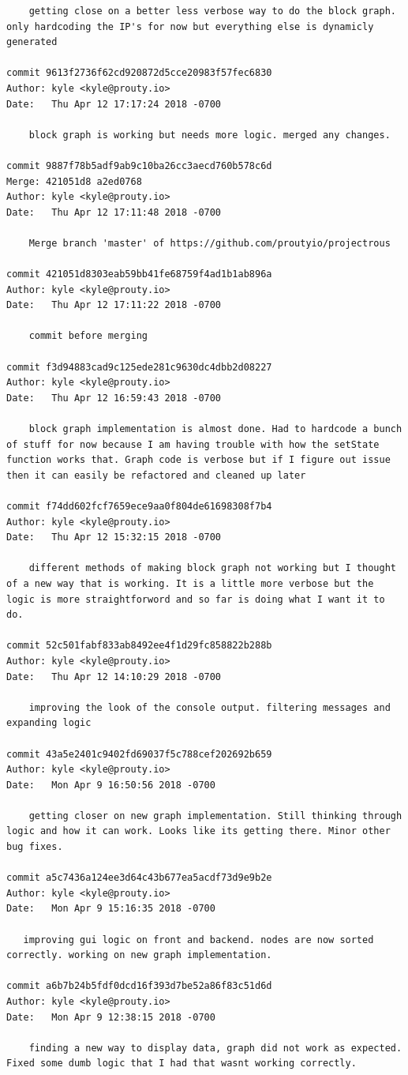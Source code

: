 \documentclass[draftclsnofoot, onecolumn, compsoc, 10pt]{IEEEtran}
\begin{document}
\begin{lstlisting}
    getting close on a better less verbose way to do the block graph. only hardcoding the IP's for now but everything else is dynamicly generated 

commit 9613f2736f62cd920872d5cce20983f57fec6830 
Author: kyle <kyle@prouty.io> 
Date:   Thu Apr 12 17:17:24 2018 -0700 

    block graph is working but needs more logic. merged any changes. 

commit 9887f78b5adf9ab9c10ba26cc3aecd760b578c6d 
Merge: 421051d8 a2ed0768 
Author: kyle <kyle@prouty.io> 
Date:   Thu Apr 12 17:11:48 2018 -0700 

    Merge branch 'master' of https://github.com/proutyio/projectrous 

commit 421051d8303eab59bb41fe68759f4ad1b1ab896a 
Author: kyle <kyle@prouty.io> 
Date:   Thu Apr 12 17:11:22 2018 -0700 

    commit before merging 

commit f3d94883cad9c125ede281c9630dc4dbb2d08227 
Author: kyle <kyle@prouty.io> 
Date:   Thu Apr 12 16:59:43 2018 -0700 

    block graph implementation is almost done. Had to hardcode a bunch of stuff for now because I am having trouble with how the setState function works that. Graph code is verbose but if I figure out issue then it can easily be refactored and cleaned up later 

commit f74dd602fcf7659ece9aa0f804de61698308f7b4 
Author: kyle <kyle@prouty.io> 
Date:   Thu Apr 12 15:32:15 2018 -0700 

    different methods of making block graph not working but I thought of a new way that is working. It is a little more verbose but the logic is more straightforword and so far is doing what I want it to do. 

commit 52c501fabf833ab8492ee4f1d29fc858822b288b 
Author: kyle <kyle@prouty.io> 
Date:   Thu Apr 12 14:10:29 2018 -0700 

    improving the look of the console output. filtering messages and expanding logic 

commit 43a5e2401c9402fd69037f5c788cef202692b659 
Author: kyle <kyle@prouty.io> 
Date:   Mon Apr 9 16:50:56 2018 -0700 

    getting closer on new graph implementation. Still thinking through logic and how it can work. Looks like its getting there. Minor other bug fixes. 

commit a5c7436a124ee3d64c43b677ea5acdf73d9e9b2e 
Author: kyle <kyle@prouty.io> 
Date:   Mon Apr 9 15:16:35 2018 -0700 

   improving gui logic on front and backend. nodes are now sorted correctly. working on new graph implementation. 

commit a6b7b24b5fdf0dcd16f393d7be52a86f83c51d6d 
Author: kyle <kyle@prouty.io> 
Date:   Mon Apr 9 12:38:15 2018 -0700 

    finding a new way to display data, graph did not work as expected. Fixed some dumb logic that I had that wasnt working correctly. 
\end{lstlisting}
\end{document}
